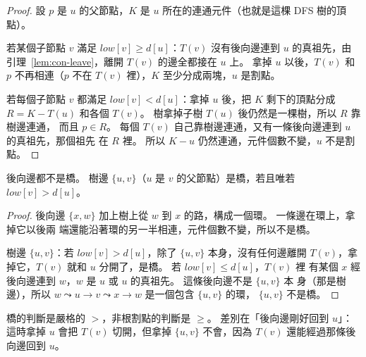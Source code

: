 \begin{proof}
設 $p$ 是 $u$ 的父節點，$K$ 是 $u$ 所在的連通元件（也就是這棵 DFS 樹的頂點）。

若某個子節點 $v$ 滿足 $\mathit{low}[v] \ge d[u]$：$T(v)$ 沒有後向邊連到 $u$ 的真祖先，由
引理~\ref{lem:con-leave}，離開 $T(v)$ 的邊全都接在 $u$ 上。 拿掉 $u$ 以後，$T(v)$ 和
$p$ 不再相連（$p$ 不在 $T(v)$ 裡），$K$ 至少分成兩塊，$u$ 是割點。

若每個子節點 $v$ 都滿足 $\mathit{low}[v] < d[u]$：拿掉 $u$ 後，把 $K$ 剩下的頂點分成
$R = K - T(u)$ 和各個 $T(v)$。 樹拿掉子樹 $T(u)$ 後仍然是一棵樹，所以 $R$ 靠樹邊連通，
而且 $p \in R$。 每個 $T(v)$ 自己靠樹邊連通，又有一條後向邊連到 $u$ 的真祖先，那個祖先
在 $R$ 裡。 所以 $K - u$ 仍然連通，元件個數不變，$u$ 不是割點。
\end{proof}

\begin{theorem}[橋]
\label{thm:con-bridge}
後向邊都不是橋。 樹邊 $\{u, v\}$（$u$ 是 $v$ 的父節點）是橋，若且唯若 $\mathit{low}[v]
> d[u]$。
\end{theorem}

\begin{proof}
後向邊 $\{x, w\}$ 加上樹上從 $w$ 到 $x$ 的路，構成一個環。 一條邊在環上，拿掉它以後兩
端還能沿著環的另一半相連，元件個數不變，所以不是橋。

樹邊 $\{u, v\}$：若 $\mathit{low}[v] > d[u]$，除了 $\{u, v\}$ 本身，沒有任何邊離開
$T(v)$，拿掉它，$T(v)$ 就和 $u$ 分開了，是橋。 若 $\mathit{low}[v] \le d[u]$，$T(v)$ 裡
有某個 $x$ 經後向邊連到 $w$，$w$ 是 $u$ 或 $u$ 的真祖先。 這條後向邊不是 $\{u, v\}$ 本
身（那是樹邊），所以 $w \leadsto u \to v \leadsto x \to w$ 是一個包含 $\{u, v\}$ 的環，
$\{u, v\}$ 不是橋。
\end{proof}

橋的判斷是嚴格的 $>$，非根割點的判斷是 $\ge$。 差別在「後向邊剛好回到 $u$」：這時拿掉
$u$ 會把 $T(v)$ 切開，但拿掉 $\{u, v\}$ 不會，因為 $T(v)$ 還能經過那條後向邊回到 $u$。

